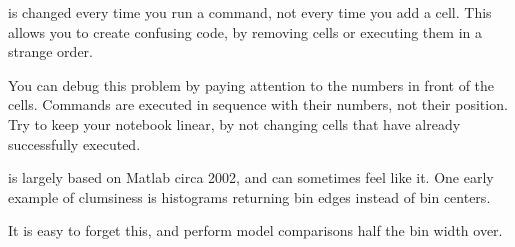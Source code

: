 \documentclass[justified, nobib]{tufte-handout}
\newcommand{\matplotlibGalleryLink}{http://matplotlib.org/gallery.html}
\newcommand{\matplotlibGalleryNote}{\footnote{You will need the syntax for
      matplotlib. You can find everything with the help commands, or can get
      syntax and ideas from \href{\matplotlibGalleryLink}{example plots} that
      others have made.}}
\begin{document}
 is changed every time you run a command, not
every time you add a cell.
This allows you to create confusing code, by removing cells or executing them in a strange order.



\noindent
You can debug this problem by paying attention to the numbers in front of the cells.
Commands are executed in sequence with their numbers, not their position.
Try to keep your notebook linear, by not changing cells that have already successfully executed.

\pagebreak

 is largely based on Matlab circa 2002, and can sometimes feel like it. One early example of clumsiness is histograms returning bin edges instead of bin centers.



\noindent
It is easy to forget this, and perform model comparisons half the bin width over.





\end{document}
